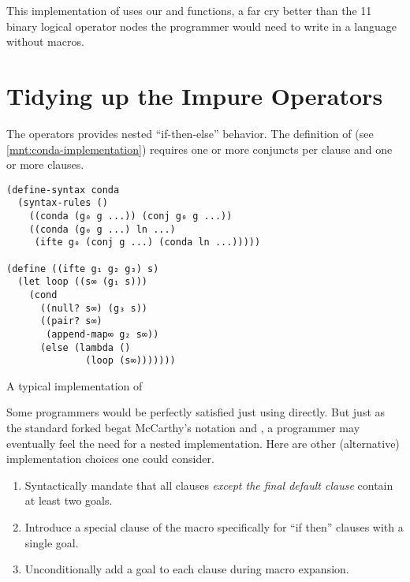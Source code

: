 \documentclass[sigplan,draft,balance,pbalance,natbib=false]{acmart}
\begin{document}
This implementation of  uses
our  and  functions, a far cry
better than the 11 binary logical operator nodes the programmer would
need to write in a language without macros.

\section{Tidying up the Impure Operators}\label{sec:impure}

The  operators provides nested
\enquote{if-then-else} behavior. The definition of 
(see \cref{mnt:conda-implementation}) requires one or more conjuncts
per clause and one or more clauses.

\begin{listing}
  \begin{verbatim}
(define-syntax conda
  (syntax-rules ()
    ((conda (g₀ g ...)) (conj g₀ g ...))
    ((conda (g₀ g ...) ln ...)
     (ifte g₀ (conj g ...) (conda ln ...)))))

(define ((ifte g₁ g₂ g₃) s)
  (let loop ((s∞ (g₁ s)))
    (cond
      ((null? s∞) (g₃ s))
      ((pair? s∞)
       (append-map∞ g₂ s∞))
      (else (lambda ()
              (loop (s∞)))))))
  \end{verbatim}
  \caption{A typical implementation of }
  \label{mnt:conda-implementation}
\end{listing}

Some programmers would be perfectly satisfied just using
 directly. But just as the standard forked
 begat McCarthy's  notation and
, a programmer may eventually feel the need for a
nested implementation. Here are other (alternative) implementation
choices one could consider.

\begin{enumerate}

\item Syntactically mandate that all clauses \emph{except the final
    default clause} contain at least two goals.

\item Introduce a special clause of the  macro
  specifically for \enquote{if then} clauses with a single goal.

\item Unconditionally add a  goal to each clause
  during macro expansion.

\end{enumerate}
\end{document}

